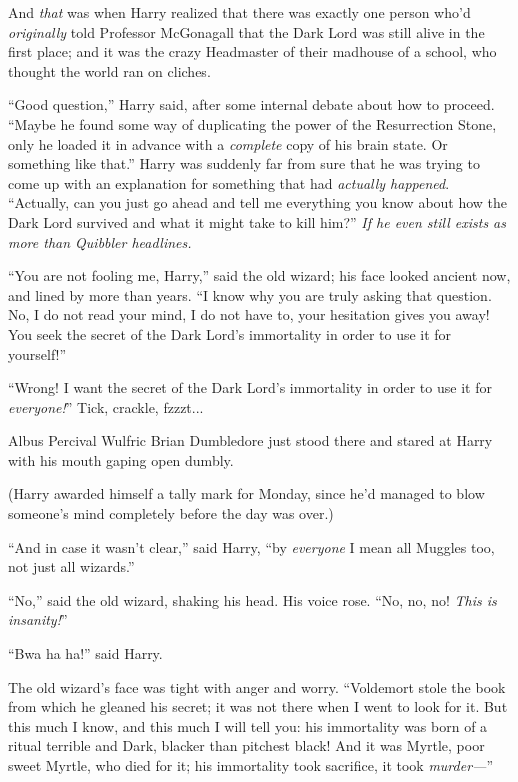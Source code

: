 And \emph{that} was when Harry realized that there was exactly one person who’d \emph{originally} told Professor McGonagall that the Dark Lord was still alive in the first place; and it was the crazy Headmaster of their madhouse of a school, who thought the world ran on cliches.

“Good question,” Harry said, after some internal debate about how to proceed. “Maybe he found some way of duplicating the power of the Resurrection Stone, only he loaded it in advance with a \emph{complete} copy of his brain state. Or something like that.” Harry was suddenly far from sure that he was trying to come up with an explanation for something that had \emph{actually happened}. “Actually, can you just go ahead and tell me everything you know about how the Dark Lord survived and what it might take to kill him?” \emph{ If he even still exists as more than Quibbler headlines.}

“You are not fooling me, Harry,” said the old wizard; his face looked ancient now, and lined by more than years. “I know why you are truly asking that question. No, I do not read your mind, I do not have to, your hesitation gives you away! You seek the secret of the Dark Lord’s immortality in order to use it for yourself!”

“Wrong! I want the secret of the Dark Lord’s immortality in order to use it for \emph{everyone!}”
\sbreak
Tick, crackle, fzzzt...

Albus Percival Wulfric Brian Dumbledore just stood there and stared at Harry with his mouth gaping open dumbly.

(Harry awarded himself a tally mark for Monday, since he’d managed to blow someone’s mind completely before the day was over.)

“And in case it wasn’t clear,” said Harry, “by \emph{everyone} I mean all Muggles too, not just all wizards.”

“No,” said the old wizard, shaking his head. His voice rose. “No, no, no! \emph{This is insanity!}”

“Bwa ha ha!” said Harry.

The old wizard’s face was tight with anger and worry. “Voldemort stole the book from which he gleaned his secret; it was not there when I went to look for it. But this much I know, and this much I will tell you: his immortality was born of a ritual terrible and Dark, blacker than pitchest black! And it was Myrtle, poor sweet Myrtle, who died for it; his immortality took sacrifice, it took \emph{murder—}”

